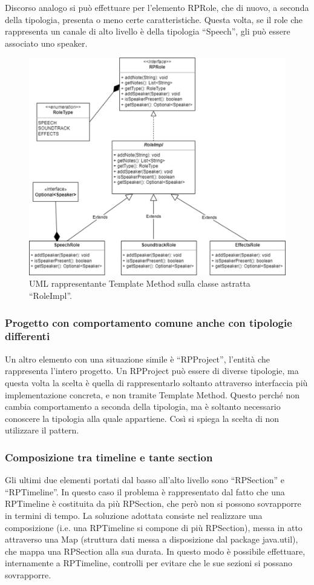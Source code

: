 \documentclass[a4paper,12pt]{report}
\begin{document}
Discorso analogo si può effettuare per l’elemento RPRole, che di nuovo, a seconda della tipologia, presenta o meno certe caratteristiche. Questa volta, se il role che rappresenta un canale di alto livello è della tipologia “Speech”, gli può essere associato uno speaker.

\begin{figure}[H]
\centering{}
\includegraphics[scale=0.85]{img/role.png}
\caption{UML rappresentante Template Method sulla classe astratta “RoleImpl”.}
\end{figure}

\subsubsection{Progetto con comportamento comune anche con tipologie differenti}
Un altro elemento con una situazione simile è “RPProject”, l’entità che rappresenta l’intero progetto. Un RPProject può essere di diverse tipologie, ma questa volta la scelta è quella di rappresentarlo soltanto attraverso interfaccia più implementazione concreta, e non tramite Template Method. Questo perché non cambia comportamento a seconda della tipologia, ma è soltanto necessario conoscere la tipologia alla quale appartiene. Così si spiega la scelta di non utilizzare il pattern.

\subsubsection{Composizione tra timeline e tante section}
Gli ultimi due elementi portati dal basso all’alto livello sono “RPSection” e “RPTimeline”. In questo caso il problema è rappresentato dal fatto che una RPTimeline è costituita da più RPSection, che però non si possono sovrapporre in termini di tempo. La soluzione adottata consiste nel realizzare una composizione (i.e. una RPTimeline si compone di più RPSection), messa in atto attraverso una Map (struttura dati messa a disposizione dal package java.util), che mappa una RPSection alla sua durata. In questo modo è possibile effettuare, internamente a RPTimeline, controlli per evitare che le sue sezioni si possano sovrapporre.
\end{document}
